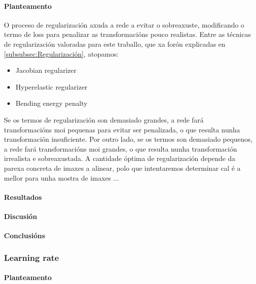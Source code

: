 \paragraph{Planteamento}
\label{par:Planteamento}

O proceso de regularización axuda a rede a evitar o sobreaxuste, modificando o termo de loss para penalizar as transformacións pouco realistas.
Entre as técnicas de regularización valoradas para este traballo, que xa forón explicadas en \ref{subsubsec:Regularización}, atopamos:

\begin{itemize}
    \item Jacobian regularizer
    \item Hyperelastic regularizer
    \item Bending energy penalty
\end{itemize}

Se os termos de regularización son demasiado grandes, a rede fará transformacións moi pequenas para evitar ser penalizada, o que resulta nunha transformación insuficiente.
Por outro lado, se os termos son demasiado pequenos, a rede fará transformacións moi grandes, o que resulta nunha transformación irrealista e sobreaxustada.
A cantidade óptima de regularización depende da parexa concreta de imaxes a alinear, polo que intentaremos determinar cal é a mellor para unha mostra de imaxes ...

\paragraph{Resultados}
\label{par:Resultados}

\paragraph{Discusión}
\label{par:Discusión}

\paragraph{Conclusións}
\label{par:Conclusións}



\subsubsection{Learning rate}
\label{subsubsec:Learning rate}

\paragraph{Planteamento}
\label{par:Planteamento}

